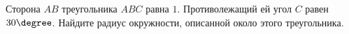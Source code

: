 \begin{ex}
	\begin{condition}
		Сторона \( AB  \) треугольника \( ABC  \) равна \( 1 \). Противолежащий ей угол \( C  \) равен \( 30\degree\). Найдите радиус окружности, описанной около этого треугольника.
	\end{condition}
\end{ex}
